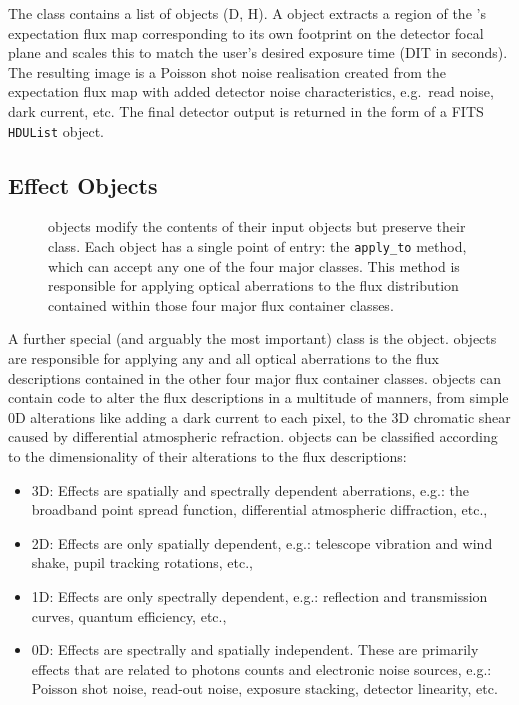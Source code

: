 The \DetectorArray{} class contains a list of \Detector{} objects (D,
H).  A \Detector{} object extracts a region of the \ImagePlane{}'s
expectation flux map corresponding to its own footprint on the
detector focal plane and scales this to match the user's desired
exposure time (DIT in seconds).  The resulting image is a Poisson shot
noise realisation created from the expectation flux map with added
detector noise characteristics, e.g.~read noise, dark current, etc.
The final detector output is returned in the form of a FITS
\lstinline{HDUList} object.


\subsection{Effect Objects}
\label{effects-objects}

\begin{figure}
  \caption{\Effect{} objects modify the contents of their input
    objects but preserve their class.  Each \Effect{} object has a
    single point of entry: the \lstinline{apply_to} method, which can
    accept any one of the four major \ScopeSim{} classes.  This method
    is responsible for applying optical aberrations to the flux
    distribution contained within those four major flux container
    classes.}
  \label{fig:effect}
\end{figure}

A further special (and arguably the most important) \ScopeSim{} class
is the \Effect{} object.  \Effect{} objects are responsible for
applying any and all optical aberrations to the flux descriptions
contained in the other four major flux container classes.  \Effect{}
objects can contain code to alter the flux descriptions in a multitude
of manners, from simple 0D alterations like adding a dark current to
each pixel, to the 3D chromatic shear caused by differential
atmospheric refraction.  \Effect{} objects can be classified according
to the dimensionality of their alterations to the flux descriptions:

\begin{itemize}
\item 3D: Effects are spatially and spectrally dependent aberrations,
  e.g.: the broadband point spread function, differential atmospheric
  diffraction, etc.,

\item 2D: Effects are only spatially dependent, e.g.: telescope
  vibration and wind shake, pupil tracking rotations, etc.,

\item 1D: Effects are only spectrally dependent, e.g.: reflection and
  transmission curves, quantum efficiency, etc.,

\item 0D: Effects are spectrally and spatially independent. These are
  primarily effects that are related to photons counts and electronic
  noise sources, e.g.: Poisson shot noise, read-out noise, exposure
  stacking, detector linearity, etc.
\end{itemize}

